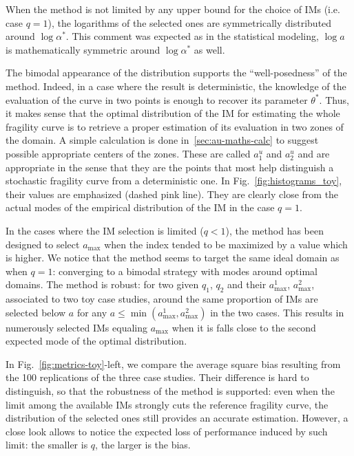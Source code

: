     
    When the method is not limited by any upper bound for the choice of IMs (i.e. case $q=1$), 
    the logarithms of the selected ones are symmetrically distributed around $\log\alpha^\ast$. This comment was expected as in the statistical modeling, $\log a$ is mathematically symmetric around $\log\alpha^\ast$ as well.
    
    The bimodal appearance of the distribution supports the ``well-posedness'' of the method. Indeed, in a case where the result is deterministic, the knowledge of the evaluation of the curve in two points is enough to recover its parameter $\theta^\ast$. Thus, it makes sense that the optimal distribution of the IM for estimating the whole fragility curve is to retrieve a proper estimation of its evaluation in two zones of the domain.
    A simple calculation is done in~\ref{sec:au-maths-calc} to suggest possible appropriate centers of the zones. 
    {These are called $a^u_1$ and $a^u_2$ and are appropriate in the sense that they are the points that most help distinguish a stochastic fragility curve from a deterministic one.}
    In Fig.~\ref{fig:histograms_toy}, their values are emphasized (dashed pink line). They are clearly close from the actual modes of the empirical distribution of the IM in the case $q=1$.
    
    
    In the cases where the IM selection is limited ($q<1$), the method has been designed to select $a_{\text{max}}$ when the index tended to be maximized by a value which is higher.
    We notice that the method seems to target the same ideal domain as when $q=1$: converging to a bimodal strategy with modes around optimal domains. The method is robust: for two given $q_1$, $q_2$ and their $a_{\text{max}}^1$, $a_{\text{max}}^2$, associated to two toy case studies, around the same proportion of IMs are selected below $a$ for any $a\leq\min(a_{\text{max}}^1, a_{\text{max}}^2)$ in the two cases.
    This results in numerously selected IMs equaling $a_{\text{max}}$ when it is falls close to the second expected mode of the optimal distribution.
    
    In Fig.~\ref{fig:metrics-toy}-left, we compare the average square bias
    resulting from the 100 replications of the three case studies.
    Their difference is hard to distinguish, so that the robustness of the method is supported: even when the limit among the available IMs strongly cuts the reference fragility curve, the distribution of the selected ones still provides an accurate estimation.
    However, a close look allows to notice the expected loss of performance induced by such limit: the smaller is $q$, the larger is the bias.
    
